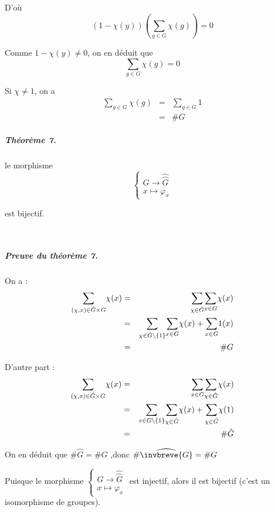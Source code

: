 D'o{\`u}
\[ (1 - \chi (y)) \left( \underset{g \in G}{\sum} \chi (g) \right) = 0 \]


Comme $1 - \chi (y) \neq 0$, on en d{\'e}duit que
\[ \underset{g \in G}{\sum} \chi (g) = 0 \]


Si $\chi \neq 1$, on a
\begin{eqnarray*}
  \underset{g \in G}{\sum} \chi (g) & = & \underset{g \in G}{\sum} 1\\
  & = & \#G
\end{eqnarray*}


\subparagraph{Th{\'e}or{\`e}me 7.}

le morphisme
\[ \left\{\begin{array}{l}
     G \rightarrow \widehat{\hat{G}}\\
     x \longmapsto \varphi_x
   \end{array}\right. \]


est bijectif.

\

\subparagraph{Preuve du th{\'e}or{\`e}me 7.}

On a :
\begin{eqnarray*}
  \underset{(\chi, x) \in \hat{G} \times G}{\sum} \chi (x) & = &
  \underset{\chi \in \hat{G}}{\sum}  \underset{x \in G}{\sum} \chi (x)\\
  & = & \underset{\chi \in \hat{G} \backslash \{ 1 \} }{\sum} 
  \underset{x \in G}{\sum} \chi (x) + \underset{x \in G}{\sum} 1 (x)\\
  & = & \#G
\end{eqnarray*}


D'autre part :
\begin{eqnarray*}
  \underset{(\chi, x) \in \hat{G} \times G}{\sum} \chi (x) & = &  \underset{x
  \in G}{\sum}  \underset{\chi \in \hat{G}}{\sum} \chi (x)\\
  & = & \underset{x \in G \backslash \{ 1 \} }{\sum} 
  \underset{\chi \in \hat{G}}{\sum} \chi (x) + \underset{\chi \in
  \hat{G}}{\sum} \chi (1)\\
  & = & \# \hat{G}
\end{eqnarray*}


On en d{\'e}duit que $\# \hat{G} =\#G$ ,donc $\# \widehat{\invbreve{G}} =\#G$

Puisque le morphisme $\left\{\begin{array}{l}
  G \rightarrow \widehat{\hat{G}}\\
  x \longmapsto \varphi_x
\end{array}\right.$ est injectif, alors il est bijectif (c'est un isomorphisme
de groupes).

